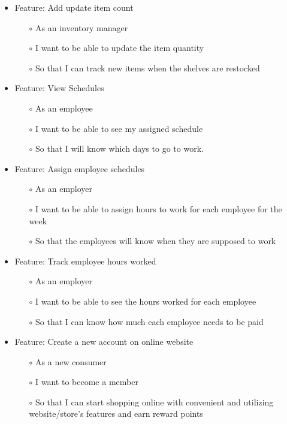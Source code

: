 \documentclass{scrreprt}
\theoremstyle{funreq}
\begin{document}
	\begin{itemize}
		\item Feature: Add update item count
		\begin{itemize}
			\item[$\circ$]As an inventory manager
			\item[$\circ$]I want to be able to update the item quantity
			\item[$\circ$]So that I can track new items when the shelves are restocked
		\end{itemize}
	\end{itemize}
	
	\begin{itemize}
		\item Feature: View Schedules
		\begin{itemize}
			\item[$\circ$]As an employee
			\item[$\circ$]I want to be able to see my assigned schedule
			\item[$\circ$]So that I will know which days to go to work.
		\end{itemize}
	\end{itemize}
	
	\begin{itemize}
		\item Feature: Assign employee schedules
		\begin{itemize}
			\item[$\circ$]As an employer
			\item[$\circ$]I want to be able to assign hours to work for each employee for the week
			\item[$\circ$]So that the employees will know when they are supposed to work
		\end{itemize}
	\end{itemize}
	
	\begin{itemize}
		\item Feature: Track employee hours worked
		\begin{itemize}
			\item[$\circ$]As an employer
			\item[$\circ$]I want to be able to see the hours worked for each employee
			\item[$\circ$]So that I can know how much each employee needs to be paid
		\end{itemize}
	\end{itemize}
	
	\begin{itemize}
		\item Feature: Create a new account on online website
		\begin{itemize}
			\item[$\circ$]As a new consumer
			\item[$\circ$]I want to become a member
			\item[$\circ$]So that I can start shopping online with convenient and utilizing website/store’s features and earn reward points
		\end{itemize}
	\end{itemize}
	
\end{document}
